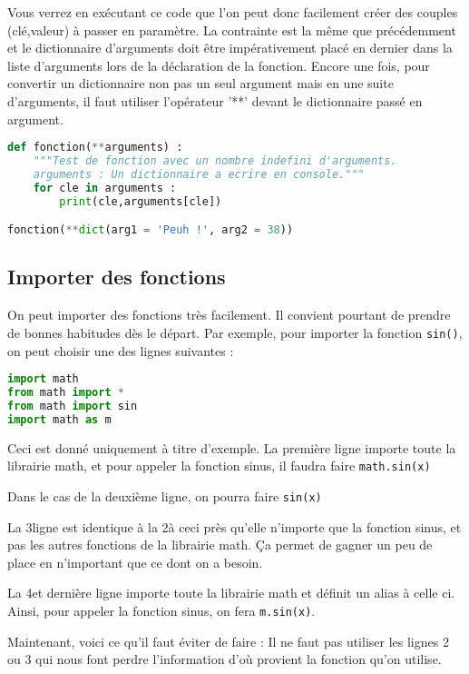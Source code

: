 \documentclass[a4paper,twoside]{article}
\begin{document}
Vous verrez en exécutant ce code que l'on peut donc facilement créer des couples (clé,valeur) à passer en paramètre. La contrainte est la même que précédemment et le dictionnaire d'arguments doit être impérativement placé en dernier dans la liste d'arguments lors de la déclaration de la fonction. Encore une fois, pour convertir un dictionnaire non pas un seul argument mais en une suite d'arguments, il faut utiliser l'opérateur '**' devant le dictionnaire passé en argument.

\begin{lstlisting}[language=python]
def fonction(**arguments) :
    """Test de fonction avec un nombre indefini d'arguments.
    arguments : Un dictionnaire a ecrire en console."""
    for cle in arguments :
        print(cle,arguments[cle])

fonction(**dict(arg1 = 'Peuh !', arg2 = 38))
\end{lstlisting}

\subsection{Importer des fonctions}\label{sec:importer_fonctions}
On peut importer des fonctions très facilement. Il convient pourtant de prendre de bonnes habitudes dès le départ. Par exemple, pour importer la fonction \texttt{sin()}, on peut choisir une des lignes suivantes :
\begin{lstlisting}[language=python]
import math
from math import *
from math import sin
import math as m
\end{lstlisting}

Ceci est donné uniquement à titre d'exemple. La première ligne importe toute la librairie math, et pour appeler la fonction sinus, il faudra faire \texttt{math.sin(x)}

Dans le cas de la deuxième ligne, on pourra faire  \texttt{sin(x)}

La 3\ieme ligne est identique à la 2\ieme à ceci près qu'elle n'importe que la fonction sinus, et pas les autres fonctions de la librairie math. Ça permet de gagner un peu de place en n'important que ce dont on a besoin.

La 4\ieme et dernière ligne importe toute la librairie math et définit un alias à celle ci. Ainsi, pour appeler la fonction sinus, on fera \texttt{m.sin(x)}.

\bigskip

Maintenant, voici ce qu'il faut éviter de faire : Il ne faut pas utiliser les lignes 2 ou 3 qui nous font perdre l'information d'où provient la fonction qu'on utilise.
\end{document}
